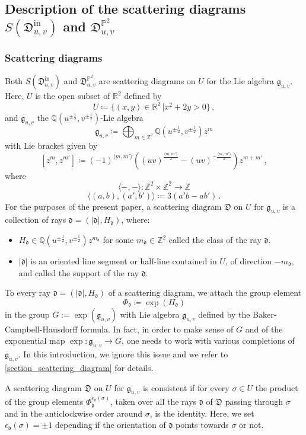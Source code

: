\documentclass[12pt, a4paper]{amsart}
\newcommand\PP{\mathbb P}
\newcommand\R{\mathbb R}
\newcommand\Q{\mathbb Q}
\newcommand\Z{\mathbb Z}
\newcommand\fd{\mathfrak d}
\newcommand\fD{\mathfrak D}
\newcommand\fg{\mathfrak g}
\newcommand\iin{\mathrm{in}}
\begin{document}
\subsection{Description of the scattering diagrams $S(\fD^\iin_{u,v})$ and $\fD^{\PP^2}_{u,v}$}
\label{section_intro_description}

\subsubsection{Scattering diagrams}
Both $S(\fD^\iin_{u,v})$ and 
$\fD^{\PP^2}_{u,v}$ are scattering diagrams on $U$ for the Lie algebra $\fg_{u,v}$. Here, $U$ is the open subset of $\R^2$ defined by 
\[ U \coloneq \{ (x,y) \in \R^2\,| x^2+2y>0\} \,,\]
and $\fg_{u,v}$ the $\Q(u^{\pm \frac{1}{2}}, v^{\pm \frac{1}{2}})$-Lie algebra 
\[\fg_{u,v}\coloneq \bigoplus_{m \in \Z^2} 
\Q(u^{\pm \frac{1}{2}}, v^{\pm \frac{1}{2}}) z^m\]
with Lie bracket given by  
\[[z^m, z^{m'}] \coloneq
(-1)^{\langle m,m'\rangle} ((uv)^{\frac{\langle m,m' \rangle}{2}}
-(uv)^{-\frac{\langle m,m' \rangle}{2}})
 z^{m+m'}\,,\]
where \[\langle -,- \rangle \colon 
\Z^2 \times \Z^2 \rightarrow \Z \]
\[ \langle (a,b), (a',b') \rangle \coloneq 
3 (a'b-ab') \,.\]
For the purposes of the present paper, a scattering diagram $\fD$ on $U$ for 
$\fg_{u,v}$ is a collection of rays $\fd=(|\fd|,H_\fd)$, where:
\begin{itemize}
\item[(i)] $H_\fd \in \Q(u^{\pm \frac{1}{2}},
v^{\pm \frac{1}{2}}) z^{m_\fd}$ for some 
$m_\fd \in \Z^2$ called the class of the ray 
$\fd$.
\item[(ii)] $|\fd|$ is an oriented line segment or half-line contained in $U$, of direction $-m_\fd$, and called the support of the ray 
$\fd$.
\end{itemize}

To every ray $\fd=(|\fd|,H_\fd)$ of a scattering diagram, we attach the group element
\[\Phi_{\fd} \coloneqq \exp(H_\fd) \]
in the group $G := \exp(\fg_{u,v})$ with Lie algebra $\fg_{u,v}$
defined by the Baker-Campbell-Hausdorff formula.
In fact, in order to make sense of $G$ and of the exponential map
$\exp \colon \fg_{u,v} \rightarrow G$, one needs to work with various completions of $\fg_{u,v}$. In this introduction, we ignore this issue and we refer to  \cref{section_scattering_diagram} for details.

A scattering diagram $\fD$ on $U$ for $\fg_{u,v}$ is consistent if for every $\sigma \in U$ the product of the group elements $\Phi_\fd^{\epsilon_\fd(\sigma)}$, taken over all the rays $\fd$ of $\fD$ passing through 
$\sigma$ and in the anticlockwise order around $\sigma$, is the identity. Here, we set $\epsilon_\fd(\sigma)=\pm 1$ depending if the orientation of $\fd$ points towards $\sigma$ or not.
\end{document}
